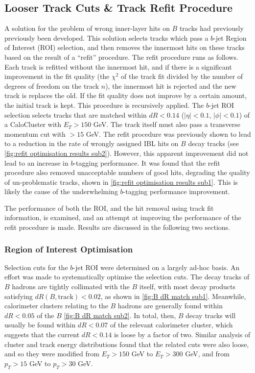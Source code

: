 \subsection{Looser Track Cuts \& Track Refit Procedure}\label{sec:bcut and refit}
A solution for the problem of wrong inner-layer hits on $B$ tracks had previously previously been developed. This solution selects tracks which pass a $b$-jet Region of Interest (ROI) selection, and then removes the innermost hits on these tracks based on the result of a ``refit'' procedure. The refit procedure runs as follows. Each track is refitted without the innermost hit, and if there is a significant improvement in the fit quality (the $\chi^2$ of the track fit divided by the number of degrees of freedom on the track $n$), the innermost hit is rejected and the new track is replaces the old. If the fit quality does not improve by a certain amount, the initial track is kept. This procedure is recursively applied. The $b$-jet ROI selection selects tracks that are matched within $dR < 0.14$ ($|\eta| < 0.1$, $|\phi| < 0.1$) of a CaloCluster with $E_T > 150$ GeV. The track itself must also pass a transverse momentum cut with \pT$>15$ GeV. The refit procedure was previously shown to lead to a reduction in the rate of wrongly assigned IBL hits on $B$ decay tracks (see \cref{fig:refit optimisation results sub2}). However, this apparent improvement did not lead to an increase in $b$-tagging performance. It was found that the refit procedure also removed unacceptable numbers of good hits, degrading the quality of un-problematic tracks, shown in \cref{fig:refit optimisation results sub1}. This is likely the cause of the underwhelming $b$-tagging performance improvement. 

The performance of both the ROI, and the hit removal using track fit information, is examined, and an attempt at improving the performance of the refit procedure is made. Results are discussed in the following two sections.

\subsubsection{Region of Interest Optimisation}\label{sec:roi opt}

Selection cuts for the $b$-jet ROI were determined on a largely ad-hoc basis. An effort was made to systematically optimise the selection cuts. The decay tracks of $B$ hadrons are tightly collimated with the $B$ itself, with most decay products satisfying $dR(B, \text{track}) < 0.02$, as shown in \cref{fig:B dR match sub1}. Meanwhile, calorimeter clusters relating to the $B$ hadrons are generally found within $dR < 0.05$ of the $B$ \cref{fig:B dR match sub2}. In total, then, $B$ decay tracks will usually be found within $dR<0.07$ of the relevant calorimeter cluster, which suggests that the current $dR<0.14$ is loose by a factor of two. Similar analysis of cluster and track energy distributions found that the related cuts were also loose, and so they were modified from $E_T > 150$ GeV to $E_T > 300$ GeV, and from $p_T > 15$ GeV to $p_T > 30$ GeV. 

